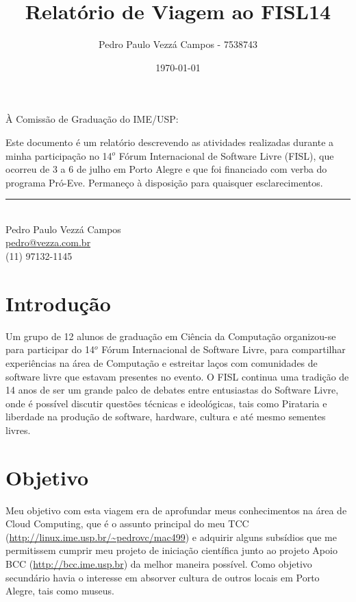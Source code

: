 \documentclass{article}
\begin{document}
\title{Relatório de Viagem ao FISL14}
\author{Pedro Paulo Vezzá Campos - 7538743}
\date{\today}

\maketitle


\hfill À Comissão de Graduação do IME/USP:\\

\vspace{1cm}

Este documento é um relatório descrevendo as atividades realizadas durante a minha participação no 14$^o$ Fórum Internacional de Software Livre (FISL), que ocorreu de 3 a 6 de julho em Porto Alegre e que foi financiado com verba do programa Pró-Eve. Permaneço à disposição para quaisquer esclarecimentos.

\vspace{5cm}

\begin{flushright}
	\noindent\rule{8cm}{0.4pt} \\
	Pedro Paulo Vezzá Campos\\
	\url{pedro@vezza.com.br}\\
	(11) 97132-1145\\
\end{flushright}

\newpage

\section{Introdução}
Um grupo de 12 alunos de graduação em Ciência da Computação organizou-se para participar do 14$^o$ Fórum Internacional de Software Livre, para compartilhar experiências na área de Computação e estreitar laços com comunidades de software livre que estavam presentes no evento. O FISL continua uma tradição de 14 anos de ser um grande palco de debates entre entusiastas do Software Livre, onde é possível discutir questões técnicas e ideológicas, tais como Pirataria e liberdade na produção de software, hardware, cultura e até mesmo sementes livres.

\section{Objetivo}
Meu objetivo com esta viagem era de aprofundar meus conhecimentos na área de Cloud Computing, que é o assunto principal do meu TCC (\url{http://linux.ime.usp.br/~pedrovc/mac499}) e adquirir alguns subsídios que me permitissem cumprir meu projeto de iniciação científica junto ao projeto Apoio BCC (\url{http://bcc.ime.usp.br}) da melhor maneira possível. Como objetivo secundário havia o interesse em absorver cultura de outros locais em Porto Alegre, tais como museus.
\end{document}
